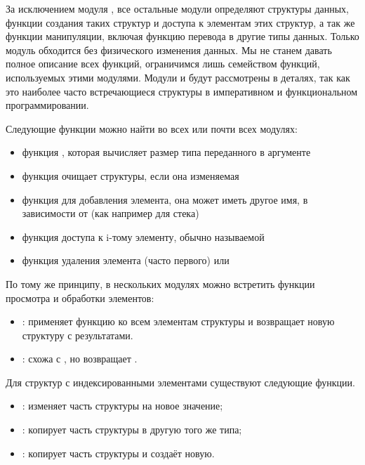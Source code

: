 За исключением модуля , все остальные модули определяют структуры 
данных, функции создания таких структур и доступа к элементам этих структур, а 
так же функции манипуляции, включая функцию перевода в другие типы данных. 
Только модуль  обходится без физического изменения данных. Мы не 
станем давать полное описание всех функций, ограничимся лишь семейством 
функций, используемых этими модулями. Модули  и  будут 
рассмотрены в деталях, так как это наиболее часто встречающиеся структуры в 
императивном и функциональном программировании.

Следующие функции можно найти во всех или почти всех модулях:

\begin{itemize}
	\item функция , которая вычисляет размер типа переданного в 
аргументе

	\item функция  очищает структуры, если она изменяемая 

	\item функция  для добавления элемента, она может иметь другое 
имя, в зависимости от  (как например  для стека) 

	\item функция доступа к i-тому элементу, обычно называемой 

	\item функция удаления элемента (часто первого)  или 
\end{itemize}

По тому же принципу, в нескольких модулях можно встретить функции просмотра и
обработки элементов:

\begin{itemize}
	\item {}: применяет функцию ко всем элементам структуры и 
возвращает новую структуру с результатами. 

	\item {}: схожа с , но возвращает \type{()}. 
\end{itemize}

Для структур с индексированными элементами существуют следующие функции.

\begin{itemize}
	\item {}: изменяет часть структуры на новое значение;

	\item {}: копирует часть структуры в другую того же типа;

	\item {}: копирует часть структуры и создаёт новую.
\end{itemize}



